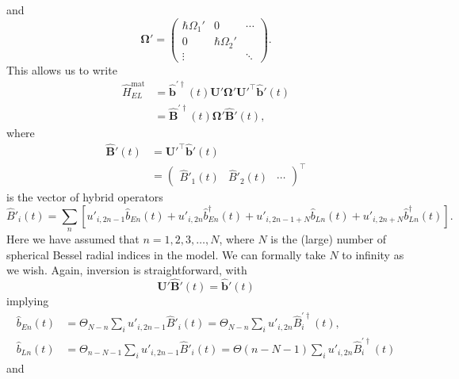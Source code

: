 \documentclass{article}
\begin{document}
and
\begin{equation}
\bm{\Omega}' = 
\begin{pmatrix}
\hbar\Omega_1' & 0 & \cdots\\
0 & \hbar\Omega_2' & \\
\vdots & & \ddots
\end{pmatrix}.
\end{equation}
This allows us to write
\begin{equation}
\begin{split}
\hat{H}_{EL}^\mathrm{mat} &= \hat{\mathbf{b}}^{\prime\dagger}(t)\mathbf{U}'\bm{\Omega}'\mathbf{U}'^\top\hat{\mathbf{b}}'(t)\\
&= \hat{\mathbf{B}}^{\prime\dagger}(t)\bm{\Omega}'\hat{\mathbf{B}}'(t),
\end{split}
\end{equation}
where
\begin{equation}
\begin{split}
\hat{\mathbf{B}}'(t) &= \mathbf{U}'^\top\hat{\mathbf{b}}'(t)\\
&= 
\begin{pmatrix}
\hat{B}'_1(t) & \hat{B}'_2(t) & \cdots
\end{pmatrix}^\top
\end{split}
\end{equation}
is the vector of hybrid operators
\begin{equation}
\hat{B}'_i(t) = \sum_n\left[u'_{i,2n - 1}\hat{b}_{En}(t) + u'_{i,2n}\hat{b}_{En}^\dagger(t) + u'_{i,2n - 1 + N}\hat{b}_{Ln}(t) + u'_{i,2n + N}\hat{b}_{Ln}^\dagger(t)\right].
\end{equation}
Here we have assumed that $n = 1,2,3,\ldots,N$, where $N$ is the (large) number of spherical Bessel radial indices in the model. We can formally take $N$ to infinity as we wish. Again, inversion is straightforward, with
\begin{equation}
\mathbf{U}'\hat{\mathbf{B}}'(t) = \hat{\mathbf{b}}'(t)
\end{equation}
implying
\begin{equation}
\begin{split}
\hat{b}_{En}(t) &= \Theta_{N - n}\sum_iu'_{i,2n - 1}\hat{B}'_i(t) = \Theta_{N - n}\sum_iu'_{i,2n}\hat{B}_i^{\prime\dagger}(t),\\
\hat{b}_{Ln}(t) &= \Theta_{n - N - 1}\sum_iu'_{i,2n - 1}\hat{B}'_i(t) = \Theta(n - N - 1)\sum_iu'_{i,2n}\hat{B}_i^{\prime\dagger}(t)
\end{split}
\end{equation}
and
\end{document}
